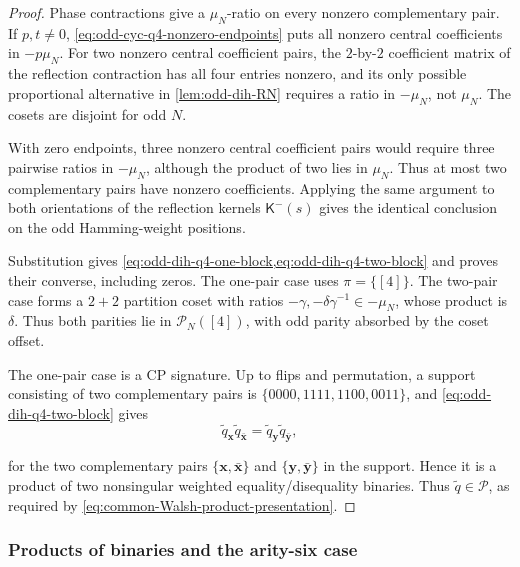\documentclass[11pt,letterpaper,onecolumn]{article}
\theoremstyle{plain}
\theoremstyle{definition}
\theoremstyle{remark}
\newcommand{\cP}{\mathscr P}
\begin{document}
	\begin{proof}
		Phase contractions give a \(\mu_N\)-ratio on every nonzero complementary
		pair.  If \(p,t\ne0\), \cref{eq:odd-cyc-q4-nonzero-endpoints} puts all nonzero central
		coefficients in \(-p\mu_N\).  For two nonzero central coefficient pairs, the
		\(2\)-by-\(2\) coefficient matrix of the reflection contraction has all
		four entries nonzero, and its only possible proportional alternative
		in \cref{lem:odd-dih-RN} requires a ratio in \(-\mu_N\), not \(\mu_N\).
		The cosets are disjoint for odd \(N\).
		
		With zero endpoints, three nonzero central coefficient pairs would require three
		pairwise ratios in \(-\mu_N\), although the product of two lies in
		\(\mu_N\).  Thus at most two complementary pairs have nonzero coefficients.  Applying the same argument
		to both orientations of the reflection kernels
		\(\mathsf K^-(s)\) gives the identical conclusion on the odd Hamming-weight positions.
		
		Substitution gives \cref{eq:odd-dih-q4-one-block,eq:odd-dih-q4-two-block}
		and proves their converse, including zeros.  The one-pair case uses \(\pi=\{[4]\}\). The two-pair case forms a \(2+2\) partition coset with ratios
		\(-\gamma,-\delta\gamma^{-1}\in-\mu_N\), whose product is \(\delta\).
		Thus both parities lie in \(\mathcal P_N([4])\), with odd parity absorbed
		by the coset offset.
		
		The one-pair case is a CP signature.  Up to flips and permutation, a
		support consisting of two complementary pairs is \(\{0000,1111,1100,0011\}\), and
		\cref{eq:odd-dih-q4-two-block} gives
		\[
		\widetilde q_{\mathbf x}\widetilde q_{\bar {\mathbf x}}
		=\widetilde q_{\mathbf y}\widetilde q_{\bar {\mathbf y}},
		\]
		
		for the two complementary pairs \(\{{\mathbf x},\bar {\mathbf x}\}\) and
		\(\{{\mathbf y},\bar {\mathbf y}\}\) in the support.  Hence it is a product of two
		nonsingular weighted equality/disequality
		binaries.  Thus \(\widetilde q\in\cP\), as required by
		\cref{eq:common-Walsh-product-presentation}.
	\end{proof}
	
	\subsubsection{Products of binaries and the arity-six case}
	\label{subsec:odd-dih-q6}
	
\end{document}
